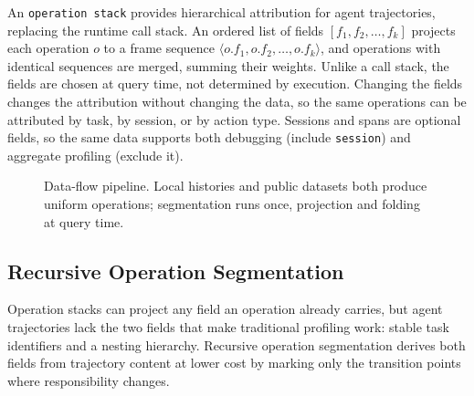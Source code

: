 \documentclass[sigconf,nonacm]{acmart}
\newcommand{\opstack}{\texttt{operation stack}\xspace}
\begin{document}
\label{sec:stacks}
An \opstack provides hierarchical attribution for agent trajectories, replacing the runtime call stack. An ordered list of fields
$[f_1, f_2, \ldots, f_k]$ projects each operation $o$ to a frame
sequence $\langle o.f_1, o.f_2, \ldots, o.f_k \rangle$, and
operations with identical sequences are merged, summing their
weights.
Unlike a call stack, the fields are chosen at query time, not
determined by execution.
Changing the fields changes the attribution without changing the data, so the same operations can be attributed by task, by session, or by action type.
Sessions and spans are optional fields, so the same data supports both debugging (include \texttt{session}) and aggregate profiling (exclude it).

\begin{figure}[t]
\centering
\resizebox{\linewidth}{!}{}
\caption{Data-flow pipeline. Local histories and public datasets both produce uniform operations; segmentation runs once, projection and folding at query time.}
\label{fig:architecture}
\end{figure}

\subsection{Recursive Operation Segmentation}
\label{sec:intent}

Operation stacks can project any field an operation already carries, but agent trajectories lack the two fields that make traditional profiling work: stable task identifiers and a nesting hierarchy. Recursive operation segmentation derives both fields from trajectory content at lower cost by marking only the transition points where responsibility changes.
\end{document}
